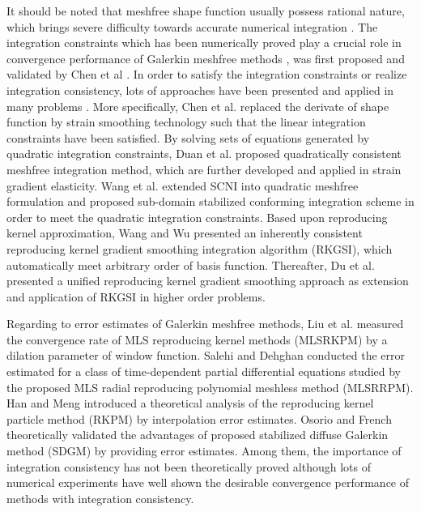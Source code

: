 It should be noted that meshfree shape function usually possess rational nature, which brings severe difficulty towards accurate numerical integration \cite{ref29,ref30}.
The integration constraints which has been numerically proved play a crucial role in convergence performance of Galerkin meshfree methods \cite{ref31,ref32,ref33,ref34,ref35}, was first proposed and validated by Chen et al \cite{ref31,ref32}.
In order to satisfy the integration constraints or realize integration consistency, lots of approaches have been presented and applied in many problems \cite{ref33,ref34,ref35,ref36,ref37,ref38,ref39,ref40,ref41,ref42,ref43,ref44}.
More specifically, Chen et al. \cite{ref31,ref32} replaced the derivate of shape function by strain smoothing technology such that the linear integration constraints have been satisfied.
By solving sets of equations generated by quadratic integration constraints, Duan et al. \cite{ref35,ref40} proposed quadratically consistent meshfree integration method, which are further developed and applied in strain gradient elasticity.
Wang et al. \cite{ref42} extended SCNI into quadratic meshfree formulation and proposed sub-domain stabilized conforming integration scheme in order to meet the quadratic integration constraints.
Based upon reproducing kernel approximation, Wang and Wu \cite{ref43} presented an inherently consistent reproducing kernel gradient smoothing integration algorithm (RKGSI), which automatically meet arbitrary order of basis function.
Thereafter, Du et al. \cite{ref45} presented a unified reproducing kernel gradient smoothing approach as extension and application of RKGSI in higher order problems.

Regarding to error estimates of Galerkin meshfree methods, Liu et al. \cite{ref46} measured the convergence rate of MLS reproducing kernel methods (MLSRKPM) by a dilation parameter of window function.
Salehi and Dehghan \cite{ref47} conducted the error estimated for a class of time-dependent partial differential equations studied by the proposed MLS radial reproducing polynomial meshless method (MLSRRPM).
Han and Meng \cite{ref48} introduced a theoretical analysis of the reproducing kernel particle method (RKPM) by interpolation error estimates.
Osorio and French \cite{ref49} theoretically validated the advantages of proposed stabilized diffuse Galerkin method (SDGM) by providing error estimates.
Among them, the importance of integration consistency has not been theoretically proved although lots of numerical experiments have well shown the desirable convergence performance of methods with integration consistency.

